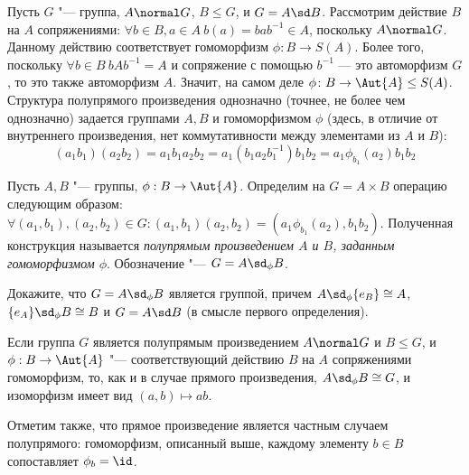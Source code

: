 \begin{note}
	Пусть $G$ "--- группа, $A \normal G$, $B \le G$, и $G = A \sd B$. Рассмотрим действие $B$ на $A$ сопряжениями: $\forall b \in B, a \in A\ b(a) = bab^{-1} \in A$, поскольку $A \normal G$. Данному действию соответствует гомоморфизм $\phi \colon B \to S(A)$. Более того, поскольку $\forall b \in B\ bAb^{-1} = A$ и сопряжение с помощью $b^{-1}$ --- это автоморфизм $G$, то это также автоморфизм $A$. Значит, на самом деле $\phi \colon B \to \Aut{A} \le S(A)$. Структура полупрямого произведения однозначно (точнее, не более чем однозначно) задается группами $A, B$ и гомоморфизмом $\phi$ (здесь, в отличие от внутреннего произведения, нет коммутативности между элементами из $A$ и $B$):
	\[
		(a_1b_1)(a_2b_2) = a_1b_1a_2b_2 = a_1(b_1a_2b_1^{-1})b_1b_2 = a_1 \phi_{b_1}(a_2)b_1b_2
	\]
\end{note}

\begin{definition}
	Пусть $A, B$ "--- группы, $\phi: B \to \Aut{A}$. Определим на $G = A \times B$ операцию следующим образом: $\forall (a_1, b_1), (a_2, b_2) \in G: (a_1, b_1)(a_2, b_2) = (a_1\phi_{b_1}(a_2), b_1b_2)$. Полученная конструкция называется \textit{полупрямым произведением $A$ и $B$, заданным гомоморфизмом $\phi$}. Обозначение "--- $G = A \sd_\phi B$.
\end{definition}

\begin{exercise}
	Докажите, что $G = A \sd_\phi B$ является группой, причем $A \sd_\phi \{e_B\} \cong A$, $\{e_A\} \sd_\phi B \cong B$ и $G = A \sd B$ (в смысле первого определения).
\end{exercise}

\begin{note}
	Если группа $G$ является полупрямым произведением $A \normal G$ и $B \le G$, и $\phi: B \to \Aut{A}$ "--- соответствующий действию $B$ на $A$ сопряжениями гомоморфизм, то, как и в случае прямого произведения, $A \sd_\phi B \cong G$, и изоморфизм имеет вид $(a, b) \mapsto ab$.
	
	Отметим также, что прямое произведение является частным случаем полупрямого: гомоморфизм, описанный выше, каждому элементу $b \in B$ сопоставляет $\phi_b = \id$.
\end{note}